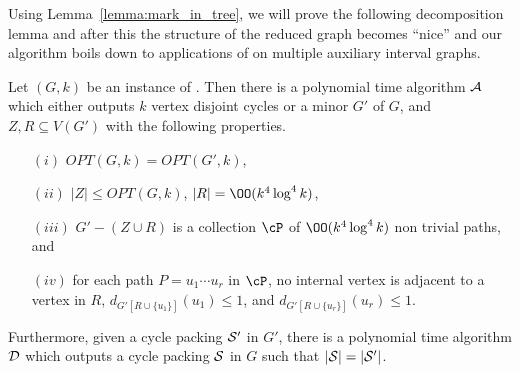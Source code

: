 Using Lemma~\ref{lemma:mark_in_tree}, we will prove the following decomposition lemma and after this the structure of the reduced graph becomes ``nice'' and our algorithm boils down to applications of \shortULI{$\epsilon$} on multiple auxiliary interval graphs.  


\begin{lemma}
\label{lem:CP_path_creation}
Let $(G,k)$ be an instance of \CP. Then there is a polynomial time algorithm ${\cal A}$ which either 
outputs $k$ vertex disjoint cycles or 
a minor $G'$ of $G$, and $Z,R\subseteq V(G')$ with the following properties.
\begin{itemize}
\setlength{\itemsep}{-2pt}
\item[$(i)$] $OPT(G,k)=OPT(G',k)$, 
\item[$(ii)$] $\vert Z \vert \leq OPT(G,k)$, $\vert R\vert = \OO(k^4\log^4 k)$, 
\item[$(iii)$] $G'-(Z\cup R)$ is a  collection $\cP$ of  $\OO(k^4\log^4 k)$ non trivial paths, and 
\item[$(iv)$] for each path $P=u_1\cdots u_r$ in $\cP$, no internal vertex is adjacent to a vertex in $R$, \;
$d_{G'[R\cup \{u_1\}]}(u_1)  \leq 1$, and $d_{G'[R\cup \{u_r\}]}(u_r) \leq 1$.
\end{itemize}
Furthermore, given a cycle packing ${\cal S'}$ in $G'$, there is a polynomial time algorithm ${\cal D}$ which 
outputs a cycle packing ${\cal S}$ in $G$ such that $\vert {\cal S}\vert=\vert {\cal S'}\vert$. 
\end{lemma}

